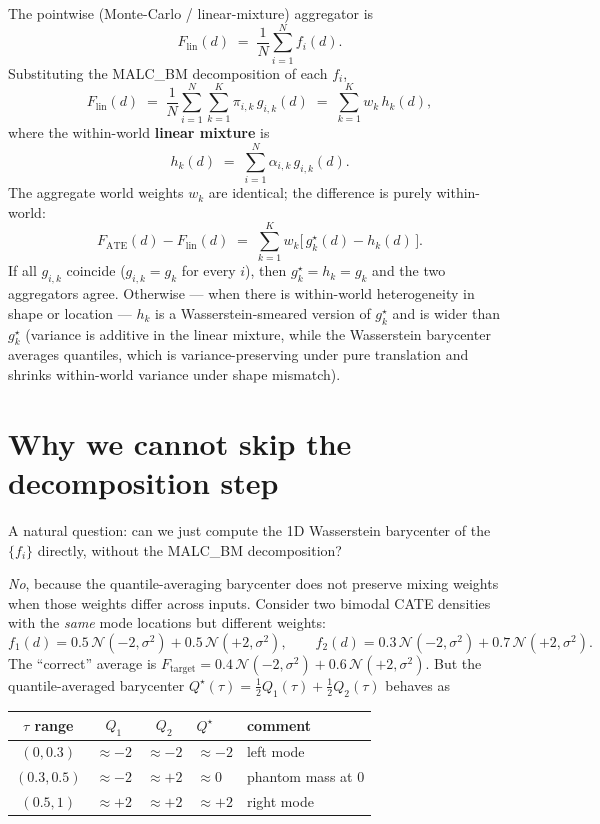 \documentclass[11pt]{article}
\newcommand{\Norm}{\mathcal{N}}
\newcommand{\Fate}{F_{\mathrm{ATE}}}
\newcommand{\Flin}{F_{\mathrm{lin}}}
\begin{document}
The pointwise (Monte-Carlo / linear-mixture) aggregator is
\[
  \Flin(d) \;=\; \frac{1}{N}\sum_{i=1}^{N} f_i(d).
\]
Substituting the MALC\_BM decomposition of each $f_i$,
\[
  \Flin(d) \;=\; \frac{1}{N}\sum_{i=1}^{N}\sum_{k=1}^{K} \pi_{i,k}\, g_{i,k}(d)
              \;=\; \sum_{k=1}^{K} w_k\, h_k(d),
\]
where the within-world \textbf{linear mixture} is
\[
  h_k(d) \;=\; \sum_{i=1}^{N} \alpha_{i,k}\, g_{i,k}(d).
\]
The aggregate world weights $w_k$ are identical; the difference is purely within-world:
\begin{equation}
  \Fate(d) - \Flin(d) \;=\; \sum_{k=1}^{K} w_k \bigl[\, g_k^\star(d) - h_k(d) \,\bigr].
  \label{eq:diff}
\end{equation}
If all $g_{i,k}$ coincide ($g_{i,k} = g_k$ for every $i$), then $g_k^\star = h_k = g_k$ and the two aggregators agree. Otherwise --- when there is within-world heterogeneity in shape or location --- $h_k$ is a Wasserstein-smeared version of $g_k^\star$ and is wider than $g_k^\star$ (variance is additive in the linear mixture, while the Wasserstein barycenter averages quantiles, which is variance-preserving under pure translation and shrinks within-world variance under shape mismatch).

\section{Why we cannot skip the decomposition step}

A natural question: can we just compute the 1D Wasserstein barycenter of the $\{f_i\}$ directly, without the MALC\_BM decomposition?

\emph{No}, because the quantile-averaging barycenter does not preserve mixing weights when those weights differ across inputs. Consider two bimodal CATE densities with the \emph{same} mode locations but different weights:
\[
  f_1(d) = 0.5\,\Norm(-2, \sigma^2) + 0.5\,\Norm(+2, \sigma^2), \qquad
  f_2(d) = 0.3\,\Norm(-2, \sigma^2) + 0.7\,\Norm(+2, \sigma^2).
\]
The ``correct'' average is $F_{\mathrm{target}} = 0.4\,\Norm(-2, \sigma^2) + 0.6\,\Norm(+2, \sigma^2)$. But the quantile-averaged barycenter $Q^\star(\tau) = \tfrac12 Q_1(\tau) + \tfrac12 Q_2(\tau)$ behaves as

\begin{center}
\begin{tabular}{cccll}
\toprule
$\tau$ range & $Q_1$ & $Q_2$ & $Q^\star$ & comment \\
\midrule
$(0, 0.3)$ & $\approx -2$ & $\approx -2$ & $\approx -2$ & left mode \\
$(0.3, 0.5)$ & $\approx -2$ & $\approx +2$ & $\approx 0$ & phantom mass at 0 \\
$(0.5, 1)$ & $\approx +2$ & $\approx +2$ & $\approx +2$ & right mode \\
\bottomrule
\end{tabular}
\end{center}
\end{document}
